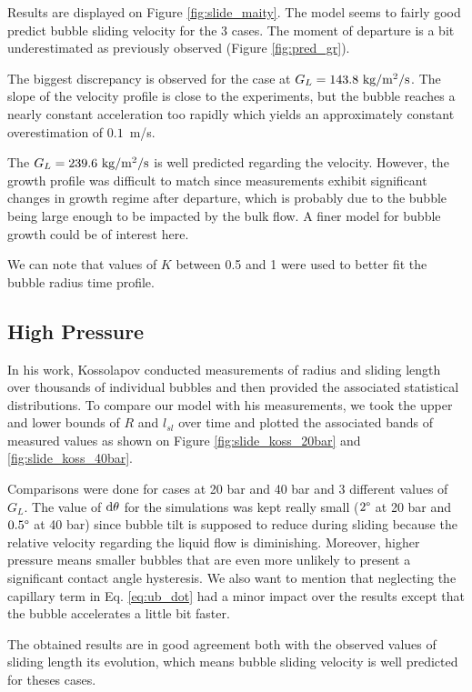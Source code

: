 Results are displayed on Figure \ref{fig:slide_maity}. The model seems to fairly good predict bubble sliding velocity for the 3 cases. The moment of departure is a bit underestimated as previously observed (Figure \ref{fig:pred_gr}).

The biggest discrepancy is observed for the case at $G_{L}=143.8~ \text{kg/m$^{2}$/s}$. The slope of the velocity profile is close to the experiments, but the bubble reaches a nearly constant acceleration too rapidly which yields an approximately constant overestimation of $0.1$~m/s.

The $G_{L}=239.6~ \text{kg/m$^{2}$/s}$ is well predicted regarding the velocity. However, the growth profile was difficult to match since measurements exhibit significant changes in growth regime after departure, which is probably due to the bubble being large enough to be impacted by the bulk flow. A finer model for bubble growth could be of interest here.


We can note that values of $K$ between 0.5 and 1 were used to better fit the bubble radius time profile.



\subsection{High Pressure}

In his work, Kossolapov conducted measurements of radius and sliding length over thousands of individual bubbles and then provided the associated statistical distributions. To compare our model with his measurements, we took the upper and lower bounds of $R$ and $l_{sl}$ over time and plotted the associated bands of measured values as shown on Figure \ref{fig:slide_koss_20bar} and \ref{fig:slide_koss_40bar}.


Comparisons were done for cases at 20 bar and 40 bar and 3 different values of $G_{L}$. The value of $\mathrm{d}\theta$ for the simulations was kept really small ($2 \degree$ at 20 bar and $0.5\degree$ at 40 bar) since bubble tilt is supposed to reduce during sliding because the relative velocity regarding the liquid flow is diminishing. Moreover, higher pressure means smaller bubbles that are even more unlikely to present a significant contact angle hysteresis. We also want to mention that neglecting the capillary term in Eq. \ref{eq:ub_dot} had a minor impact over the results except that the bubble accelerates a little bit faster. 

The obtained results are in good agreement both with the observed values of sliding length its evolution, which means bubble sliding velocity is well predicted for theses cases.


